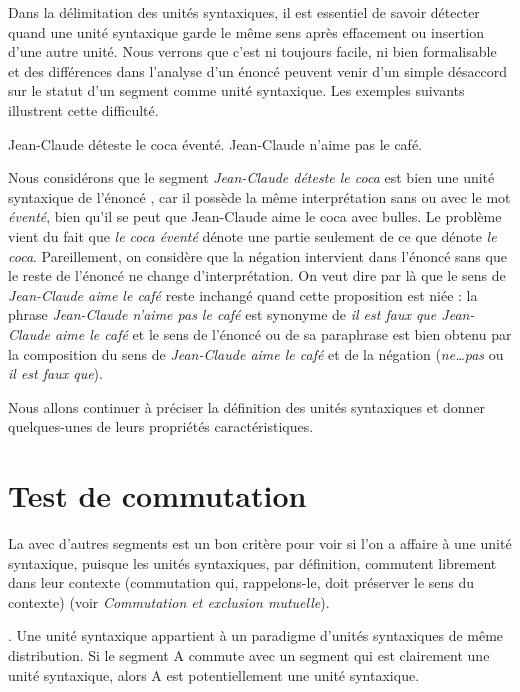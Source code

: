 Dans la délimitation des unités syntaxiques, il est essentiel de savoir détecter quand une unité syntaxique garde le même sens après effacement ou insertion d’une autre unité. Nous verrons que c’est ni toujours facile, ni bien formalisable et des différences dans l’analyse d’un énoncé peuvent venir d’un simple désaccord sur le statut d’un segment comme unité syntaxique. Les exemples suivants illustrent cette difficulté.

\ea%
    \label{ex:key:1}
          {Jean-Claude}  {déteste}  {le}  {coca}  {éventé.}
\ex%
    \label{ex:key:2}
          {Jean-Claude}  {n’aime}  {pas}  {le}  {café.}
\z

Nous considérons que le segment \textit{Jean-Claude déteste le coca} est bien une unité syntaxique de l’énoncé , car il possède la même interprétation sans ou avec le mot \textit{éventé}, bien qu’il se peut que Jean-Claude aime le coca avec bulles. Le problème vient du fait que \textit{le coca éventé} dénote une partie seulement de ce que dénote \textit{le coca}. Pareillement, on considère que la négation intervient dans l’énoncé  sans que le reste de l’énoncé ne change d’interprétation. On veut dire par là que le sens de \textit{Jean-Claude aime le café} reste inchangé quand cette proposition est niée : la phrase \textit{Jean-Claude n’aime pas le café} est synonyme de \textit{il est faux que Jean-Claude aime le café} et le sens de l’énoncé  ou de sa paraphrase est bien obtenu par la composition du sens de \textit{Jean-Claude aime le café} et de la négation (\textit{ne…pas} ou \textit{il est faux que}).

Nous allons continuer à préciser la définition des unités syntaxiques et donner quelques-unes de leurs propriétés caractéristiques.

\section{Test de commutation}\label{sec:3.2.10}

La  avec d’autres segments est un bon critère pour voir si l’on a affaire à une unité syntaxique, puisque les unités syntaxiques, par définition, commutent librement dans leur contexte (commutation qui, rappelons-le, doit préserver le sens du contexte) (voir  \textit{Commutation et exclusion mutuelle}).

\begin{styleLivreImportant}
. Une unité syntaxique appartient à un paradigme d’unités syntaxiques de même distribution. Si le segment A commute avec un segment qui est clairement une unité syntaxique, alors A est potentiellement une unité syntaxique.
\end{styleLivreImportant}

